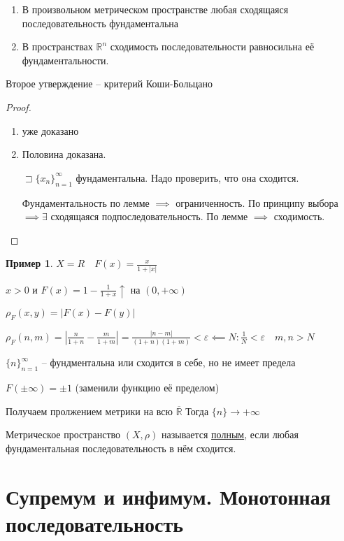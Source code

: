 \documentclass{book}
\newcommand\R{\ensuremath{\mathbb{R}}}
\newcommand{\ov}[1]{\overline{#1}}
\theoremstyle{definition}
\newtheorem*{example}{Пример}
\begin{document}
\begin{theorem}
    \begin{enumerate}
        \item В произвольном метрическом пространстве любая сходящаяся последовательность фундаментальна
        \item В пространствах $\R^n$ сходимость последовательности равносильна её фундаментальности.
    \end{enumerate}
    Второе утверждение -- критерий Коши-Больцано
\end{theorem}
\begin{proof}
    \begin{enumerate}
        \item уже доказано
        \item Половина доказана.

            $\sqsupset \{x_{n}\}_{n=1}^{\infty } $ фундаментальна. Надо проверить, что она сходится.

            Фундаментальность по лемме $\implies $ ограниченность. По принципу выбора $\implies \exists $ сходящаяся подпоследовательность. По лемме $\implies $ сходимость.
    \end{enumerate}
\end{proof}

\begin{example}
    $X=R\quad F(x) = \frac{x}{1+\left| x \right| }$ 

        $x>0$ и $F(x)=1-\frac{1}{1+x} \uparrow \text{ на } (0, +\infty )$

        $\rho_F(x, y) = \left| F(x) - F(y) \right| $

        $\rho_F(n, m) = \left| \frac{n}{1+n}-\frac{m}{1+m} \right| = \frac{|n-m|}{(1+n)(1+m)}<\varepsilon \impliedby N: \frac{1}{N}<\varepsilon\quad m, n>N$

        $\{n\}_{n=1}^{\infty }$ -- фундментальна или сходится в себе, но не имеет предела

        $F(\pm\infty ) = \pm 1$ (заменили функцию её пределом)

        Получаем пролжением метрики на всю $\ov {\R}$ Тогда $\{n\}\to +\infty $
\end{example}

\begin{definition}
    Метрическое пространство $(X,\rho)$ называется \underline{полным}, если любая фундаментальная последовательность в нём сходится.
\end{definition}

\section{Супремум и инфимум. Монотонная последовательность}
\end{document}
